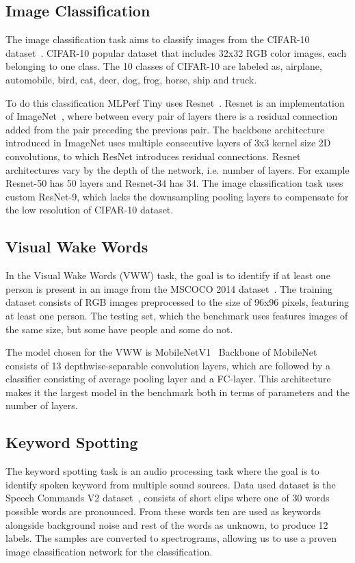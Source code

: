 \documentclass[12pt,a4paper,english
]{tunithesis}
\begin{document}
\subsection{Image Classification}
\label{sec:tinyperf-ic}
The image classification task aims to classify images from the CIFAR-10 dataset~\cite{Cifar10Krizhevsky09learningmultiple}. CIFAR-10 popular dataset that includes 32x32 RGB color images, each belonging to one class. The 10 classes of CIFAR-10 are labeled as, airplane, automobile, bird, cat, deer, dog, frog, horse, ship and truck.

To do this classification MLPerf Tiny uses Resnet~\cite{he2015deepresiduallearningimage}. Resnet is an implementation of ImageNet~\cite{krizhevsky_imagenet_2012}, where between every pair of layers there is a residual connection added from the pair preceding the previous pair.
The backbone architecture introduced in ImageNet uses multiple consecutive layers of 3x3 kernel size 2D convolutions, to which ResNet introduces residual connections.
Resnet architectures vary by the depth of the network, i.e. number of layers. For example Resnet-50 has 50 layers and Resnet-34 has 34. The image classification task uses custom ResNet-9, which lacks the downsampling pooling layers to compensate for the low resolution of CIFAR-10 dataset.

\subsection{Visual Wake Words}
In the Visual Wake Words (VWW) task, the goal is to identify if at least one person is present in an image from the MSCOCO 2014 dataset~\cite{lin_microsoft_2015}.
The training dataset consists of RGB images preprocessed to the size of 96x96 pixels, featuring at least one person. The testing set, which the benchmark uses features images of the same size, but some have people and some do not.

The model chosen for the VWW is MobileNetV1~\cite{howard2017mobilenetsefficientconvolutionalneural}
Backbone of MobileNet consists of 13 depthwise-separable convolution layers, which are followed by a classifier consisting of average pooling layer and a FC-layer. This architecture makes it the largest model in the benchmark both in terms of parameters and the number of layers.

\subsection{Keyword Spotting}
The keyword spotting task is an audio processing task where the goal is to identify spoken keyword from multiple sound sources. Data used dataset is the Speech Commands V2 dataset~\cite{warden_speech_2018}, consists of short clips where one of 30 words possible words are pronounced. From these words ten are used as keywords alongside background noise and rest of the words as unknown, to produce 12 labels. The samples are converted to spectrograms, allowing us to use a proven image classification network for the classification.
\end{document}

